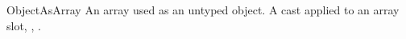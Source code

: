 
\begin{pattern}{ObjectAsArray}
An array used as an untyped object.
A cast applied to an array slot, \eg, .

\end{pattern}
